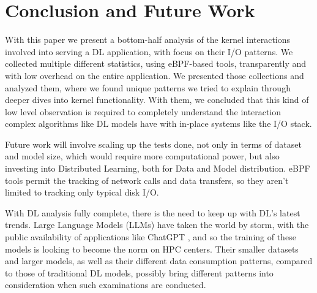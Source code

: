 \documentclass[conference]{IEEEtran}
\begin{document}


\section{Conclusion and Future Work}

With this paper we present a bottom-half analysis of the kernel interactions involved into serving a DL application, with focus on their I/O patterns. We collected multiple different statistics, using eBPF-based tools, transparently and with low overhead on the entire application. We presented those collections and analyzed them, where we found unique patterns we tried to explain through deeper dives into kernel functionality. With them, we concluded that this kind of low level observation is required to completely understand the interaction complex algorithms like DL models have with in-place systems like the I/O stack.

Future work will involve scaling up the tests done, not only in terms of dataset and model size, which would require more computational power, but also investing into Distributed Learning, both for Data and Model distribution. eBPF tools permit the tracking of network calls and data transfers, so they aren't limited to tracking only typical disk I/O.

With DL analysis fully complete, there is the need to keep up with DL's latest trends. Large Language Models (LLMs) have taken the world by storm, with the public availability of applications like ChatGPT \cite{chatgpt}, and so the training of these models is looking to become the norm on HPC centers. Their smaller datasets and larger models, as well as their different data consumption patterns, compared to those of traditional DL models, possibly bring different patterns into consideration when such examinations are conducted.


\end{document}
